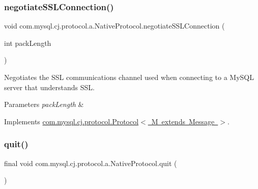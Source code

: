\mbox{\label{classcom_1_1mysql_1_1cj_1_1protocol_1_1a_1_1_native_protocol_a176849031728bdd55f4904b7a38ffa99}} 
\subsubsection{\texorpdfstring{negotiate\+S\+S\+L\+Connection()}{negotiateSSLConnection()}}
{\footnotesize\ttfamily void com.\+mysql.\+cj.\+protocol.\+a.\+Native\+Protocol.\+negotiate\+S\+S\+L\+Connection (\begin{DoxyParamCaption}\item[{int}]{pack\+Length }\end{DoxyParamCaption})}

Negotiates the S\+SL communications channel used when connecting to a My\+S\+QL server that understands S\+SL.


\begin{DoxyParams}{Parameters}
{\em pack\+Length} & \\
\hline
\end{DoxyParams}


Implements \mbox{\hyperlink{interfacecom_1_1mysql_1_1cj_1_1protocol_1_1_protocol_adb74cf66c1d6f69ff114d3d6c45db6dd}{com.\+mysql.\+cj.\+protocol.\+Protocol$<$ M extends Message $>$}}.

\mbox{\label{classcom_1_1mysql_1_1cj_1_1protocol_1_1a_1_1_native_protocol_a068e7a1606a75477e944516d5888ef2a}} 
\subsubsection{\texorpdfstring{quit()}{quit()}}
{\footnotesize\ttfamily final void com.\+mysql.\+cj.\+protocol.\+a.\+Native\+Protocol.\+quit (\begin{DoxyParamCaption}{ }\end{DoxyParamCaption})}

